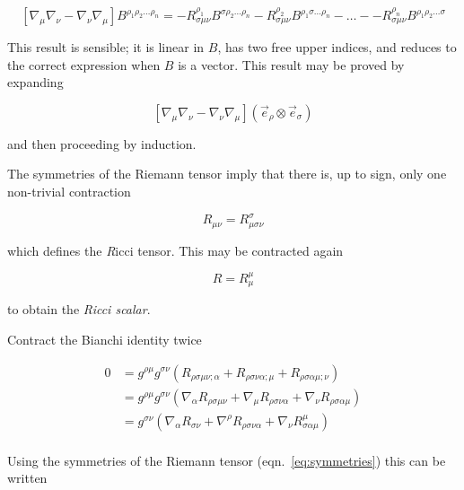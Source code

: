 \begin{equation}
\label{eq:higher_order_riemann}
\left[\nabla_\mu \nabla_\nu - \nabla_\nu \nabla_\mu\right] 
B^{\rho_1 \rho_2 \ldots \rho_n}
= - R^{\rho_1}_{\sigma \mu\nu} B^{\sigma \rho_2 \ldots \rho_n}
- R^{\rho_2}_{\sigma \mu\nu} B^{\rho_1 \sigma \ldots \rho_n}
- \ldots -
- R^{\rho_n}_{\sigma \mu\nu} B^{\rho_1 \rho_2 \ldots \sigma }
\end{equation}

This result is sensible; it is linear in $B$, has two free upper
indices, and reduces to the correct expression when $B$ is a vector.
This result may be proved by expanding 

\begin{equation*}
\left[\nabla_\mu \nabla_\nu - \nabla_\nu \nabla_\mu\right] 
(\vec{e}_\rho \otimes \vec{e}_\sigma)
\end{equation*}

and then proceeding by induction.  

The symmetries of the Riemann tensor imply that there is, up to sign,
only one non-trivial contraction

\begin{equation}
R_{\mu\nu} = R^\sigma_{\mu\sigma\nu}
\end{equation}

which defines the {\emph Ricci tensor}.  This may be contracted again

\begin{equation}
R = R^\mu_\mu
\end{equation}

to obtain the \emph{Ricci scalar}.


Contract the Bianchi identity twice

\begin{align*}
0 &=
g^{\rho\mu} g^{\sigma\nu}
\left(R_{\rho\sigma\mu\nu;\alpha}
+R_{\rho\sigma\nu\alpha;\mu}
+R_{\rho\sigma\alpha\mu;\nu}\right) \\
&= g^{\rho\mu} g^{\sigma\nu}
\left(\nabla_\alpha R_{\rho\sigma\mu\nu}
+ \nabla_\mu R_{\rho\sigma\nu\alpha}
+ \nabla_\nu R_{\rho\sigma\alpha\mu}\right) \\
&= g^{\sigma\nu}
\left(\nabla_\alpha R_{\sigma\nu}
+ \nabla^\rho R_{\rho\sigma\nu\alpha}
+ \nabla_\nu R^\mu_{\sigma\alpha\mu}\right) \\
\end{align*}

Using the symmetries of the Riemann tensor (eqn.~\ref{eq:symmetries})
this can be written

